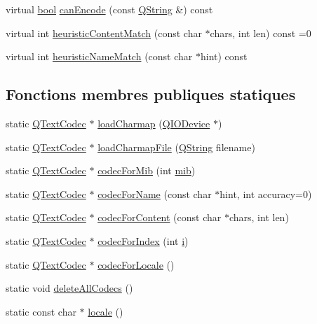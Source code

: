 \begin{DoxyCompactItemize}
\item 
virtual \hyperlink{qglobal_8h_a1062901a7428fdd9c7f180f5e01ea056}{bool} \hyperlink{class_q_text_codec_afca461125d8ab540b551f274b72c53d2}{can\+Encode} (const \hyperlink{class_q_string}{Q\+String} \&) const 
\item 
virtual int \hyperlink{class_q_text_codec_a23804f330e0c85ef385b87694abf9cd9}{heuristic\+Content\+Match} (const char $\ast$chars, int len) const  =0
\item 
virtual int \hyperlink{class_q_text_codec_a0c704f1050c1b79fca236226049b9e66}{heuristic\+Name\+Match} (const char $\ast$hint) const 
\end{DoxyCompactItemize}
\subsection*{Fonctions membres publiques statiques}
\begin{DoxyCompactItemize}
\item 
static \hyperlink{class_q_text_codec}{Q\+Text\+Codec} $\ast$ \hyperlink{class_q_text_codec_acf1f7d7dc7f47e434b269eb8efd458de}{load\+Charmap} (\hyperlink{class_q_i_o_device}{Q\+I\+O\+Device} $\ast$)
\item 
static \hyperlink{class_q_text_codec}{Q\+Text\+Codec} $\ast$ \hyperlink{class_q_text_codec_a655a88489c4308af769f992617a5ec53}{load\+Charmap\+File} (\hyperlink{class_q_string}{Q\+String} filename)
\item 
static \hyperlink{class_q_text_codec}{Q\+Text\+Codec} $\ast$ \hyperlink{class_q_text_codec_a4706a5d4023d048cc1c655dfa2b16e68}{codec\+For\+Mib} (int \hyperlink{qtextcodec_8cpp_aca6df2f6e00e0b706e267293baed2153}{mib})
\item 
static \hyperlink{class_q_text_codec}{Q\+Text\+Codec} $\ast$ \hyperlink{class_q_text_codec_ade1d10ad04ecafc6d7ec54ba91ba7841}{codec\+For\+Name} (const char $\ast$hint, int accuracy=0)
\item 
static \hyperlink{class_q_text_codec}{Q\+Text\+Codec} $\ast$ \hyperlink{class_q_text_codec_aeb3ec365c6c4f1812689a2b66ed09e27}{codec\+For\+Content} (const char $\ast$chars, int len)
\item 
static \hyperlink{class_q_text_codec}{Q\+Text\+Codec} $\ast$ \hyperlink{class_q_text_codec_a84d9d45afc8d26c0b7d5b26f81c813bf}{codec\+For\+Index} (int \hyperlink{060__command__switch_8tcl_a8c90afd4641b25be86bd09983c3cbee0}{i})
\item 
static \hyperlink{class_q_text_codec}{Q\+Text\+Codec} $\ast$ \hyperlink{class_q_text_codec_af21be033ce39428087bb853054f15ff5}{codec\+For\+Locale} ()
\item 
static void \hyperlink{class_q_text_codec_a4c333273ed9037228a03e8f3a850f431}{delete\+All\+Codecs} ()
\item 
static const char $\ast$ \hyperlink{class_q_text_codec_aafe5cdca0b371b80f87be4d6e131d4a8}{locale} ()
\end{DoxyCompactItemize}
